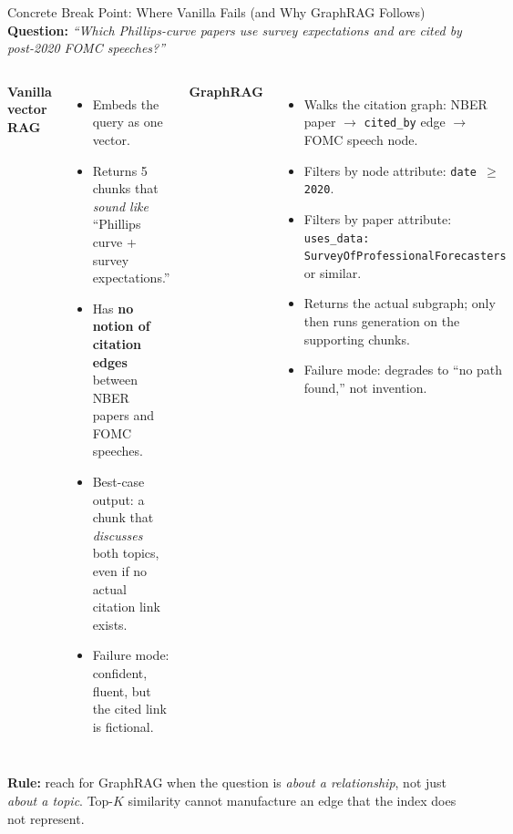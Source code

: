 \begin{frame}{Concrete Break Point: Where Vanilla Fails (and Why GraphRAG Follows)}
\textbf{Question:} \emph{``Which Phillips-curve papers use survey expectations and are cited by post-2020 FOMC speeches?''}

\medskip
\begin{columns}[T,totalwidth=\textwidth]
\textbf{Vanilla vector RAG}
\begin{itemize}\small
\item Embeds the query as one vector.
\item Returns 5 chunks that \emph{sound like} ``Phillips curve + survey expectations.''
\item Has \textbf{no notion of citation edges} between NBER papers and FOMC speeches.
\item Best-case output: a chunk that \emph{discusses} both topics, even if no actual citation link exists.
\item Failure mode: confident, fluent, but the cited link is fictional.
\end{itemize}

\textbf{GraphRAG}
\begin{itemize}\small
\item Walks the citation graph: NBER paper $\to$ \texttt{cited\_by} edge $\to$ FOMC speech node.
\item Filters by node attribute: \texttt{date $\geq$ 2020}.
\item Filters by paper attribute: \texttt{uses\_data: SurveyOfProfessionalForecasters} or similar.
\item Returns the actual subgraph; only then runs generation on the supporting chunks.
\item Failure mode: degrades to ``no path found,'' not invention.
\end{itemize}
\end{columns}

\vspace{0.25cm}
\begin{takeawaybox}
\textbf{Rule:} reach for GraphRAG when the question is \emph{about a relationship}, not just \emph{about a topic}. Top-$K$ similarity cannot manufacture an edge that the index does not represent.
\end{takeawaybox}
\end{frame}

